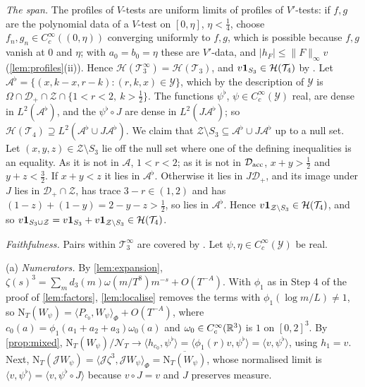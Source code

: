 \documentclass[11pt,colorlinks]{charlie}
\newcommand{\Om}{\Omega}
\newcommand{\ip}[2]{\langle #1,#2\rangle}
\begin{document}
\emph{The span.} The profiles of $V$-tests are uniform limits of profiles of $V'$-tests: if $f,g$ are the polynomial data of a $V$-test on $[0,\eta]$, $\eta<\frac14$, choose $f_n,g_n\in C_c^\infty((0,\eta))$ converging uniformly to $f,g$, which is possible because $f,g$ vanish at $0$ and $\eta$; with $a_0=b_0=\eta$ these are $V'$-data, and $|h_F|\le\|F\|_\infty v$ (\cref{lem:profiles}(ii)). Hence $\mathcal H(\mathcal T_3^\infty)=\mathcal H(\mathcal T_3)$, and $v\mathbf{1}_{S_3}\in\mathcal H(\mathcal T_4)$ by . Let $\mathcal A^\flat=\{(x,k-x,r-k):(r,k,x)\in\mathcal Y\}$, which by the description of $\mathcal Y$ is $\Om\cap\mathcal D_+\cap\mathcal Z\cap\{1<r<2,\ k>\frac12\}$. The functions $\psi^\flat$, $\psi\in C_c^\infty(\mathcal Y)$ real, are dense in $L^2(\mathcal A^\flat)$, and the $\psi^\flat\circ J$ are dense in $L^2(J\mathcal A^\flat)$; so $\mathcal H(\mathcal T_4)\supseteq L^2(\mathcal A^\flat\cup J\mathcal A^\flat)$. We claim that $\mathcal Z\setminus S_3\subseteq\mathcal A^\flat\cup J\mathcal A^\flat$ up to a null set. Let $(x,y,z)\in\mathcal Z\setminus S_3$ lie off the null set where one of the defining inequalities is an equality. As it is not in $\mathcal A$, $1<r<2$; as it is not in $\mathcal D_{\rm acc}$, $x+y>\frac12$ and $y+z<\frac32$. If $x+y<z$ it lies in $\mathcal A^\flat$. Otherwise it lies in $J\mathcal D_+$, and its image under $J$ lies in $\mathcal D_+\cap\mathcal Z$, has trace $3-r\in(1,2)$ and has $(1-z)+(1-y)=2-y-z>\frac12$, so lies in $\mathcal A^\flat$. Hence $v\mathbf{1}_{\mathcal Z\setminus S_3}\in\mathcal H(\mathcal T_4)$, and so $v\mathbf{1}_{S_3\cup\mathcal Z}=v\mathbf{1}_{S_3}+v\mathbf{1}_{\mathcal Z\setminus S_3}\in\mathcal H(\mathcal T_4)$.

\emph{Faithfulness.} Pairs within $\mathcal T_3^\infty$ are covered by . Let $\psi,\eta\in C_c^\infty(\mathcal Y)$ be real.

(a) \emph{Numerators.} By \cref{lem:expansion}, $\zeta(s)^3=\sum_md_3(m)\omega(m/T^8)m^{-s}+O(T^{-A})$. With $\phi_1$ as in Step 4 of the proof of \cref{lem:factors}, \cref{lem:localise} removes the terms with $\phi_1(\log m/L)\ne1$, so $\mathrm N_T(W_\psi)=\ip{P_{c_0}}{W_\psi}_\Phi+O(T^{-A})$, where $c_0(a)=\phi_1(a_1+a_2+a_3)\omega_0(a)$ and $\omega_0\in C_c^\infty(\mathbb{R}^3)$ is $1$ on $[0,2]^3$. By \cref{prop:mixed}, $\mathrm N_T(W_\psi)/\mathcal N_T\to\ip{h_{c_0}}{\psi^\flat}=\ip{\phi_1(r)v}{\psi^\flat}=\ip v{\psi^\flat}$, using $h_1=v$. Next, $\mathrm N_T(\mathcal JW_\psi)=\ip{\mathcal J\zeta^3}{\mathcal JW_\psi}_\Phi=\overline{\mathrm N_T(W_\psi)}$, whose normalised limit is $\ip v{\psi^\flat}=\ip v{\psi^\flat\circ J}$ because $v\circ J=v$ and $J$ preserves measure.
\end{document}
